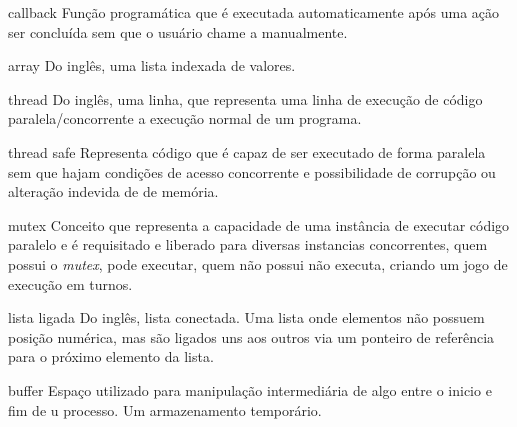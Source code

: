 \begin{siglas}
    \item[callback]          Função programática que é executada automaticamente após uma ação ser concluída sem que o usuário chame a manualmente. 
    \item[array]             Do inglês, uma lista indexada de valores. 
    \item[thread]            Do inglês, uma linha, que representa uma linha de execução de código paralela/concorrente a execução normal de um programa.
    \item[thread safe]       Representa código que é capaz de ser executado de forma paralela sem que hajam condições de acesso concorrente e possibilidade de corrupção ou alteração indevida de de memória.
    \item[mutex]             Conceito que representa a capacidade de uma instância de executar código paralelo e é requisitado e liberado para diversas instancias concorrentes, quem possui o \textit{mutex}, pode executar, quem não possui não executa, criando um jogo de execução em turnos.  
    \item[lista ligada]       Do inglês, lista conectada. Uma lista onde elementos não possuem posição numérica, mas são ligados uns aos outros via um ponteiro de referência para o próximo elemento da lista.
    \item[buffer]            Espaço utilizado para manipulação intermediária de algo entre o inicio e fim de u processo. Um armazenamento temporário.   

\end{siglas}


\tableofcontents*
\cleardoublepage